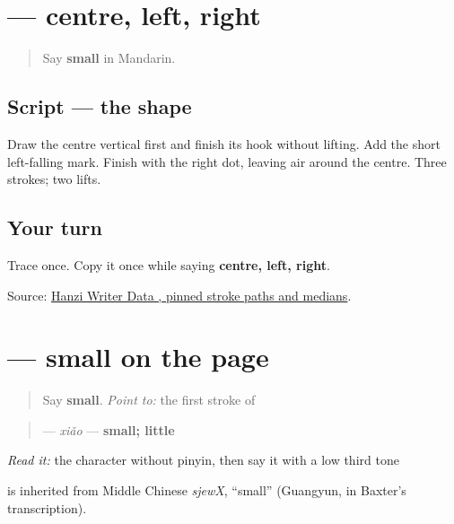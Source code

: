 \section[\texorpdfstring{\zh{小} (xiǎo)}{小 (xiǎo)}]{ — centre, left, right}

\label{lesson:ZH-W14-xiao}



\begin{quote}
Say \textbf{small} in Mandarin.
\end{quote}

\subsection*{Script — the shape}

Draw the centre vertical first and finish its hook without lifting. Add the short left-falling mark. Finish with the right dot, leaving air around the centre. Three strokes; two lifts.

\subsection*{Your turn}
Trace \textbf{} once. Copy it once while saying \textbf{centre, left, right}.

\begin{tcolorbox}[breakable,colback=teal!4,colframe=teal!35!black,title={Before you move on}]
Source: \href{https://raw.githubusercontent.com/chanind/hanzi-writer-data/68d10a4b21150cae5e1ebbd223eed289cf32d90c/data/\%E5\%B0\%8F.json}{Hanzi Writer Data , pinned stroke paths and medians}.
\end{tcolorbox}
\section[\texorpdfstring{\zh{小} (xiǎo)}{小 (xiǎo)}]{ — small on the page}

\label{lesson:ZH-C14-xiao}



\begin{quote}
Say \textbf{small}. \emph{Point to:} the first stroke of 
\end{quote}

\begin{cousinweb}
\begin{quote}
\textbf{} — \emph{xiǎo} — \textbf{small; little}
\end{quote}

\emph{Read it:} the character without pinyin, then say it with a low third tone

\textbf{} is inherited from Middle Chinese \emph{sjewX}, \textquotedblleft{}small\textquotedblright{} (Guangyun, in Baxter's transcription).
\end{cousinweb}

